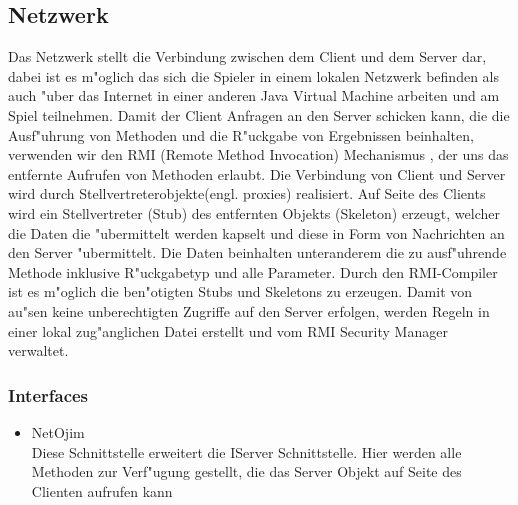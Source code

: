 \documentclass[a4paper,10pt]{article}
\begin{document}
\subsection{Netzwerk}
Das Netzwerk stellt die Verbindung zwischen dem Client und dem Server dar, dabei ist es m"oglich das sich die Spieler in einem lokalen
Netzwerk befinden als auch "uber das Internet in einer anderen Java Virtual Machine arbeiten und am Spiel teilnehmen. Damit der Client Anfragen an den Server schicken kann, die die Ausf"uhrung von Methoden und die R"uckgabe von Ergebnissen beinhalten, verwenden wir den RMI (Remote Method Invocation) Mechanismus , der uns das entfernte Aufrufen von Methoden erlaubt. Die Verbindung von Client und Server wird durch Stellvertreterobjekte(engl. proxies) realisiert. Auf Seite des Clients wird ein Stellvertreter (Stub) des entfernten Objekts (Skeleton) erzeugt, welcher die Daten die "ubermittelt werden kapselt und diese in Form von Nachrichten an den Server "ubermittelt. Die Daten beinhalten unteranderem die zu ausf"uhrende Methode inklusive R"uckgabetyp und alle Parameter. Durch den RMI-Compiler ist es m"oglich die ben"otigten Stubs und Skeletons zu erzeugen. Damit von au"sen keine unberechtigten Zugriffe auf den Server erfolgen, werden Regeln in einer lokal zug"anglichen Datei erstellt und vom RMI Security Manager verwaltet.    
  
\subsubsection{Interfaces}
\begin{itemize}
\item NetOjim \\
Diese Schnittstelle erweitert die IServer Schnittstelle. Hier werden alle Methoden zur Verf"ugung gestellt, die das Server Objekt auf Seite des Clienten aufrufen kann
\end{itemize}
\end{document}

